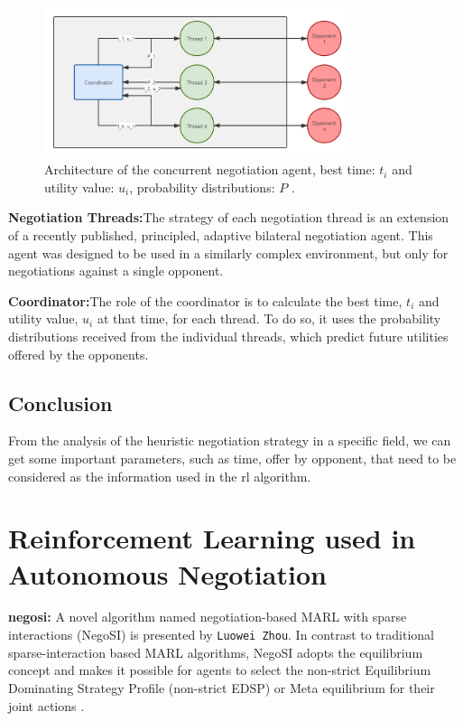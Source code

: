 \begin{figure}[htbp]
\centering
\includegraphics[width=0.8\textwidth]{./images/heuristic_concurrent_negotiation.png}
\caption{Architecture of the concurrent negotiation agent, best time: $t_i$ and utility value: $u_i$, probability distributions: $P$ \parencite{Williams12Concurrent}.}
\label{fig:heuristic-concurrent-negotiation}
\end{figure}

\textbf{Negotiation Threads:}The strategy of each negotiation thread is an extension of a recently published, principled, adaptive bilateral negotiation agent. This agent was designed to be used in a similarly complex environment, but only for negotiations against a single opponent.

\textbf{Coordinator:}The role of the coordinator is to calculate the best time, $t_i$ and utility value, $u_i$ at that time, for each thread. To do so, it uses the probability distributions received from the individual threads, which predict future utilities offered by the opponents.

\subsection{Conclusion}
From the analysis of the heuristic negotiation strategy in a specific field, we can get some important parameters, such as time, offer by opponent, that need to be considered as the information used in the \gls{rl} algorithm.

\section{Reinforcement Learning used in Autonomous Negotiation}
\textbf{\gls{negosi}:} A novel algorithm named negotiation-based MARL
with sparse interactions (NegoSI) is presented by \texttt{Luowei Zhou}. In contrast to traditional sparse-interaction based MARL algorithms, NegoSI adopts the equilibrium concept and makes it possible for agents to select the non-strict Equilibrium Dominating Strategy Profile (non-strict EDSP) or Meta equilibrium for their joint actions \parencite{L2017NegoSI}.


